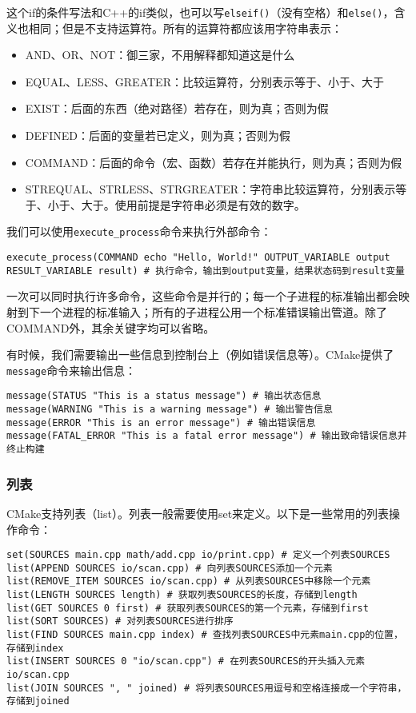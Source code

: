 这个if的条件写法和C++的if类似，也可以写\texttt{elseif()}（没有空格）和\texttt{else()}，含义也相同；但是不支持运算符。所有的运算符都应该用字符串表示：
\begin{itemize}
  \item AND、OR、NOT：御三家，不用解释都知道这是什么
  \item EQUAL、LESS、GREATER：比较运算符，分别表示等于、小于、大于
  \item EXIST：后面的东西（绝对路径）若存在，则为真；否则为假
  \item DEFINED：后面的变量若已定义，则为真；否则为假
  \item COMMAND：后面的命令（宏、函数）若存在并能执行，则为真；否则为假
  \item STREQUAL、STRLESS、STRGREATER：字符串比较运算符，分别表示等于、小于、大于。使用前提是字符串必须是有效的数字。
\end{itemize}

我们可以使用\texttt{execute\_process}命令来执行外部命令：
\begin{lstlisting}
execute_process(COMMAND echo "Hello, World!" OUTPUT_VARIABLE output RESULT_VARIABLE result) # 执行命令，输出到output变量，结果状态码到result变量
\end{lstlisting}
一次可以同时执行许多命令，这些命令是并行的；每一个子进程的标准输出都会映射到下一个进程的标准输入；所有的子进程公用一个标准错误输出管道。除了COMMAND外，其余关键字均可以省略。

有时候，我们需要输出一些信息到控制台上（例如错误信息等）。CMake提供了\texttt{message}命令来输出信息：
\begin{lstlisting}
message(STATUS "This is a status message") # 输出状态信息
message(WARNING "This is a warning message") # 输出警告信息
message(ERROR "This is an error message") # 输出错误信息
message(FATAL_ERROR "This is a fatal error message") # 输出致命错误信息并终止构建
\end{lstlisting}

\subsubsection{列表}

CMake支持列表（list）。列表一般需要使用set来定义。以下是一些常用的列表操作命令：
\begin{lstlisting}
set(SOURCES main.cpp math/add.cpp io/print.cpp) # 定义一个列表SOURCES
list(APPEND SOURCES io/scan.cpp) # 向列表SOURCES添加一个元素
list(REMOVE_ITEM SOURCES io/scan.cpp) # 从列表SOURCES中移除一个元素
list(LENGTH SOURCES length) # 获取列表SOURCES的长度，存储到length
list(GET SOURCES 0 first) # 获取列表SOURCES的第一个元素，存储到first
list(SORT SOURCES) # 对列表SOURCES进行排序
list(FIND SOURCES main.cpp index) # 查找列表SOURCES中元素main.cpp的位置，存储到index
list(INSERT SOURCES 0 "io/scan.cpp") # 在列表SOURCES的开头插入元素io/scan.cpp
list(JOIN SOURCES ", " joined) # 将列表SOURCES用逗号和空格连接成一个字符串，存储到joined
\end{lstlisting}

